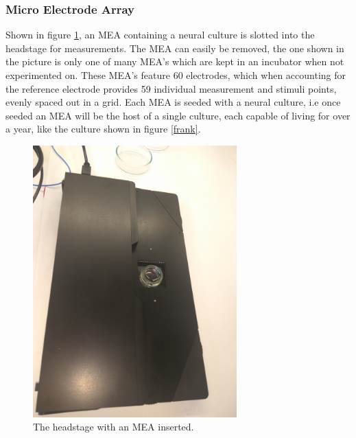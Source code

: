 \subsubsection{Micro Electrode Array}
Shown in figure \ref{MEAhs}, an MEA
containing a neural culture is slotted into the headstage for measurements.
The MEA can easily be removed, the one shown in the picture is only one
of many MEA's which are kept in an incubator when not experimented on.
These MEA's feature 60 electrodes, which when accounting for the reference
electrode provides 59 individual measurement and stimuli points, evenly spaced
out in a grid.
Each MEA is seeded with a neural culture, i.e once seeded an MEA will
be the host of a single culture, each capable of living for over a year, like
the culture shown in figure \ref{frank}.
\begin{figure}[h!]
  \centering
  \includegraphics[width=0.7\textwidth]{fig/HS_with_MEA.jpg}
  \caption[MEA2100 headstage with MEA]{
    The headstage with an MEA inserted.
  }
  \label{MEAhs}
\end{figure}
